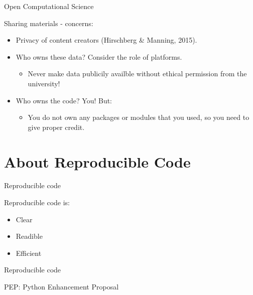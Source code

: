 \documentclass[compress]{beamer}
\begin{document}
\begin{frame}{Open Computational Science}
	
\begin{alertblock}{Sharing materials - concerns:}
	\begin{itemize}
		\item Privacy of content creators (Hirschberg \& Manning, 2015).
		\item Who owns these data? Consider the role of platforms.
		\begin{itemize}
			\item Never make data publicily availble without ethical permission from the university!
		\end{itemize}
		\item Who owns the code? You! But:
		\begin{itemize}
			\item You do not own any packages or modules that you used, so you need to give proper credit.
		\end{itemize}
	\end{itemize}
\end{alertblock}
\end{frame}



\section{About Reproducible Code}

\begin{frame}{Reproducible code}
	
	Reproducible code is:
	\begin{itemize}
		\item Clear
		\item Readible
		\item Efficient
	\end{itemize}


\end{frame}



\begin{frame}{Reproducible code}

PEP: Python Enhancement Proposal
	
\end{frame}
\end{document}
